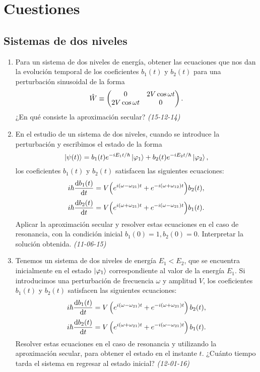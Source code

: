 \section{Cuestiones}

\subsection*{Sistemas de dos niveles}

\begin{enumerate}
    
    \item Para un sistema de dos niveles de energía, obtener las ecuaciones que nos dan la evolución temporal de los coeficientes \( b_1 (t) \) y \( b_2 (t) \) para una perturbación sinusoidal de la forma 
    \[
    \hat{W} \equiv \pmqty{ 0 & 2V \cos \omega t \\ 2V \cos \omega t & 0 }.
    \]
    ¿En qué consiste la aproximación secular? \textit{(15-12-14)}

    \item En el estudio de un sistema de dos niveles, cuando se introduce la perturbación y escribimos el estado de la forma 
    \[
    \ket{\psi (t)} = b_1 (t) e^{-i E_1 t / \hbar} \ket{\varphi_1} + b_2 (t) e^{-i E_2 t / \hbar} \ket{\varphi_2},
    \]
    los coeficientes \( b_1 (t) \) y \( b_2 (t) \) satisfacen las siguientes ecuaciones:
    \[
    i \hbar \dv{b_1 (t)}{t} = V \qty( e^{i (\omega - \omega_{21}) t} + e^{-i (\omega + \omega_{12}) t}) b_2 (t),
    \]
    \[
    i \hbar \dv{b_2 (t)}{t} = V \qty( e^{i (\omega + \omega_{21}) t} + e^{-i (\omega - \omega_{21}) t}) b_1 (t).
    \]
    Aplicar la aproximación secular y resolver estas ecuaciones en el caso de resonancia, con la condición inicial \( b_1 (0) = 1, b_2 (0) = 0 \). Interpretar la solución obtenida. \textit{(11-06-15)}

    \item Tenemos un sistema de dos niveles de energía $E_1 < E_2$, que se encuentra inicialmente en el estado $\ket{\varphi_1}$ correspondiente al valor de la energía $E_1$. Si introducimos una perturbación de frecuencia $\omega$ y amplitud $V$, los coeficientes $b_1 (t)$ y $b_2 (t)$ satisfacen las siguientes ecuaciones:
    \[
    i \hbar \dv{b_1 (t)}{t} = V \left( e^{i (\omega - \omega_{21}) t} + e^{-i (\omega + \omega_{21}) t} \right) b_2 (t),
    \]
    \[
    i \hbar \dv{b_2 (t)}{t} = V \left( e^{i (\omega + \omega_{21}) t} + e^{-i (\omega - \omega_{21}) t} \right) b_1 (t).
    \]
    Resolver estas ecuaciones en el caso de resonancia y utilizando la aproximación secular, para obtener el estado en el instante $t$. ¿Cuánto tiempo tarda el sistema en regresar al estado inicial? \textit{(12-01-16)}


\end{enumerate}
